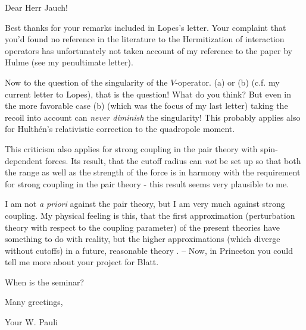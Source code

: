 \date{September 8, 1944}

Dear Herr Jauch!

Best thanks for your remarks included in Lopes's letter. Your complaint that you'd found no reference in the literature to the Hermitization of interaction operators has unfortunately not taken account of my reference to the paper by Hulme (see my penultimate letter).

Now to the question of the singularity of the $V$-operator. (a) or (b) (c.f. my current letter to Lopes), that is the question! What do you think? But even in the more favorable case (b) (which was the focus of my last letter) taking the recoil into account can \textit{never diminish} the singularity! This probably applies also for Hulth\'en's relativistic correction to the quadropole moment. 

This criticism also applies for strong coupling in the pair theory with spin-dependent forces.  Its result, that the cutoff radius can \textit{not} be set up so that both the range as well as the strength of the force is in harmony with the requirement for strong coupling in the pair theory - this result seems very plausible to me.

I am not \textit{a priori} against the pair theory, but I am very much against strong coupling. My physical feeling is this, that the first approximation (perturbation theory with respect to the coupling parameter) of the present theories have something to do with reality, but the higher approximations (which diverge without cutoffs) in a future, reasonable theory . -- Now, in Princeton you could tell me more about your project for Blatt.

When is the seminar?

Many greetings,

Your W. Pauli


